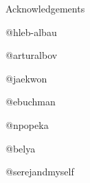 \documentclass[8pt,oneside]{amsart}
\makeatletter
\newcommand{\linkred}[2]{\href{#1}{\color{red}{#2}}}
\newcommand{\linkgreen}[2]{\href{#1}{\color{green}{#2}}}
\renewcommand\subsection{\@startsection{subsection}
                                    {2}{\z@}
                                    {-3.25ex\@plus -1ex \@minus -.2ex}
                                    {0ex \@plus .2ex}
                                    {\play\Large}
                        }
\newcommand{\titleSection}[1]{\subsection{#1}}
\makeatother
\begin{document}
\begin{multicols}{2}
\begin{enumerate}[label={[\arabic*]}]
\item \linkred{https://tools.ietf.org/html/rfc6962#section-2.1}{RFC-6962}
\item \linkgreen{https://ipfs.io/ipfs/QmdCeixQUHBjGnKfwbB1dxf4X8xnadL8xWmmEnQah5n7x2}{IBC protocol}
\item \linkgreen{https://ipfs.io/ipfs/QmaMtD7xDgghqgjN62zWZ5TBGFiEjGQtuZBjJ9sMh816KJ}{Tendermint}
\item \linkred{https://github.com/cybercongress/cyb/blob/master/docs/comparison.md}{Comparison of web3 browsers}
\item \linkred{https://github.com/cybercongress/cyb/blob/master/docs/cyb.md}{Cyb}
\item \linkred{https://github.com/cybercongress/cyb-virus}{Cyb virus}
\item \linkred{https://arxiv.org/pdf/1709.09002.pdf}{SpringRank}
\item \linkred{/docs/how_to_become_validator.md}{How to become validator in cyber protocol}
\item \linkred{https://github.com/first20hours/google-10000-english}{Top 10000 english words}
\item \linkgreen{https://ipfs.io/ipfs/QmQUWBhDMfPKgFt3NfbxM1VU22oU8CRepUzGPBDtopwap1}{Multilingual neural machine translation}
\item \linkgreen{https://ipfs.io/ipfs/QmZYKGuLHf2h1mZrhiP2FzYsjj3tWt2LYduMCRbpgi5pKG}{Foam}
\item \linkgreen{https://ipfs.io/ipfs/Qmdje3AmtsfjX9edWAxo3LFhV9CTAXoUvwGR7wHJXnc2Gk}{Coda}
\item \linkgreen{https://ipfs.io/ipfs/Qmd99xmraYip9cVv8gRMy6Y97Bkij8qUYArGDME7CzFasg}{Mimblewimble}
\item \linkgreen{https://ipfs.io/ipfs/QmdSQ1AGTizWjSRaVLJ8Bw9j1xi6CGLptNUcUodBwCkKNS}{Tezos}
\item \linkred{https://medium.com/@karpathy/software-2-0-a64152b37c35}{Software 2.0}
\item \linkred{https://medium.com/solana-labs/proof-of-history-a-clock-for-blockchain-cf47a61a9274}{Proof-of-history}
\end{enumerate}
\end{multicols}

\titleSection{Acknowledgements}\label{Acknowledgements}
\begin{multicols}{2}
\begin{enumerate}[label={[\arabic*]}]
\item @hleb-albau
\item @arturalbov
\item @jaekwon
\item @ebuchman
\item @npopeka
\item @belya
\item @serejandmyself
\end{enumerate}
\end{multicols}
\end{document}

